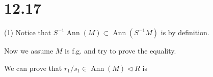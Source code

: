 
\section{12.17}

(1) Notice that $S^{-1}\operatorname{Ann}(M)\subset \operatorname{Ann}(S^{-1}M)$ is by definition. 

Now we assume $M$ is f.g. and try to prove the equality.

We can prove that $r_1/s_1\in \operatorname{Ann}(M)\triangleleft R$ is 